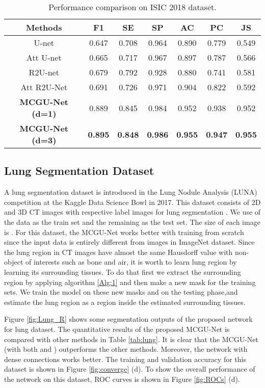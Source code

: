 \documentclass[journal]{IEEEtran}
\begin{document}
\begin{table}
\centering
\caption{Performance comparison on ISIC 2018 dataset.}
	\begin{tabular}{ccccccc}
		\hline
		\textbf{Methods} & \textbf{F1}&	\textbf{SE}&	\textbf{SP}&	\textbf{AC}&\textbf{PC}&	\textbf{JS}\\
		\hline
		U-net  \cite{ronneberger2015} & 0.647 & 0.708 &	0.964 & 0.890&	 0.779& 0.549\\
		Att U-net  \cite{oktay2018} & 0.665&	0.717 &	0.967&	 0.897 &	0.787&	 0.566\\
		R2U-net  \cite{alom2018} & 0.679 &	0.792 & 0.928& 0.880& 0.741& 0.581\\
		Att R2U-Net \cite{alom2018} &0.691&	0.726&	0.971&	0.904&	0.822&	 0.592\\
\hline
		\textbf{MCGU-Net (d=1)}& 0.889 & 0.845 &  0.984 & 0.952 & 0.938 & 0.952\\
		\textbf{MCGU-Net (d=3)}& \textbf{0.895}& \textbf{0.848}& \textbf{0.986}&	\textbf{0.955}& \textbf{0.947}& \textbf{0.955}\\
		\hline
	\end{tabular}
	\label{tab:isic18}
\end{table}


\subsection{Lung Segmentation Dataset}
A lung segmentation dataset is introduced in the Lung Nodule Analysis (LUNA) competition at the Kaggle Data Science Bowl in 2017. This dataset consists of 2D and 3D CT images with respective label images for lung segmentation \cite{lungdata}. We use  of the data as the train set and the remaining  as the test set. The size of each image is . For this dataset, the MCGU-Net works better with training from scratch since the input data is entirely different from images in ImageNet dataset.
Since the lung region in CT images have almost the same Hausdorff value with non-object of interests such as bone and air, it is worth to learn lung region by learning its surrounding tissues. To do that first we extract the surrounding region by applying algorithm \ref{Alg:1} and then make a new mask for the training sets. We train the model on these new masks and on the testing phase,and estimate the lung region as a region inside the estimated surrounding tissues. 

Figure \ref{fig:Lung_R} shows some segmentation outputs of the proposed network for lung dataset. The quantitative results of the proposed MCGU-Net is compared with other methods in Table \ref{tab:lung}. It is clear that the MCGU-Net (with both  and ) outperforms the other methods. Moreover, the network with dense connections works better. The training and validation accuracy for this dataset is shown in Figure \ref{fig:converge} (d). To show the overall performance of the network on this dataset, ROC curves is shown in Figure \ref{fig:ROCs} (d).
\end{document}
